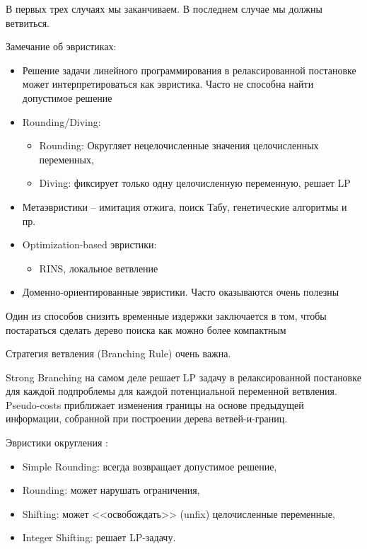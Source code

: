 \documentclass[%
	11pt,
	a4paper,
	utf8,
		]{article}
\begin{document}
В первых трех случаях мы заканчиваем. В последнем случае мы должны ветвиться.


Замечание об эвристиках:
\begin{itemize}
	\item Решение задачи линейного программирования в релаксированной постановке может интерпретироваться как эвристика. Часто не способна найти допустимое решение
	
	\item Rounding/Diving:
	\begin{itemize}
		\item Rounding: Округляет нецелочисленные значения целочисленных переменных,
		
		\item Diving: фиксирует только одну целочисленную переменную, решает LP
	\end{itemize}

    \item Метаэвристики -- имитация отжига, поиск Табу, генетические алгоритмы и пр.
    
    \item Optimization-based эвристики:
    \begin{itemize}
    	\item RINS, локальное ветвление
    \end{itemize}

    \item Доменно-ориентированные эвристики. Часто оказываются очень полезны
\end{itemize}

Один из способов снизить временные издержки заключается в том, чтобы постараться сделать дерево поиска как можно более компактным

Стратегия ветвления (Branching Rule) очень важна.

Strong Branching на самом деле решает LP задачу в релаксированной постановке для каждой подпроблемы для каждой потенциальной переменной ветвления. Pseudo-costs приближает изменения границы на основе предыдущей информации, собранной при построении дерева ветвей-и-границ.

Эвристики округления \cite{berthold:primal_heur_scip}:
\begin{itemize}
	\item Simple Rounding: всегда возвращает допустимое решение,
	
	\item Rounding: может нарушать ограничения,
	
	\item Shifting: может <<освобождать>> (unfix) целочисленные переменные,
	
	\item Integer Shifting: решает LP-задачу.
\end{itemize}
\end{document}
